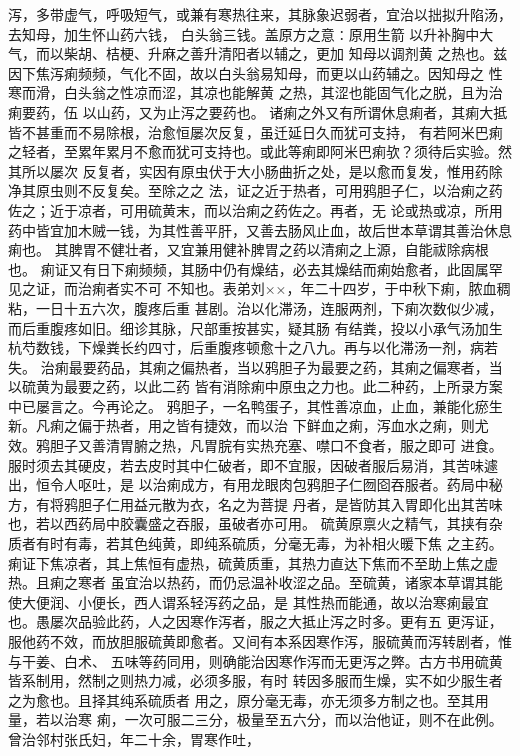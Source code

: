 \documentclass[a4paper,12pt,UTF8,twoside]{ctexbook}
\begin{document}
泻，多带虚气，呼吸短气，或兼有寒热往来，其脉象迟弱者，宜治以拙拟升陷汤，去知母，加生怀山药六钱， 
白头翁三钱。盖原方之意∶原用生箭 以升补胸中大气，而以柴胡、桔梗、升麻之善升清阳者以辅之，更加 
知母以调剂黄 之热也。兹因下焦泻痢频频，气化不固，故以白头翁易知母，而更以山药辅之。因知母之 
性寒而滑，白头翁之性凉而涩，其凉也能解黄 之热，其涩也能固气化之脱，且为治痢要药，伍 
以山药，又为止泻之要药也。 
诸痢之外又有所谓休息痢者，其痢大抵皆不甚重而不易除根，治愈恒屡次反复，虽迁延日久而犹可支持， 
有若阿米巴痢之轻者，至累年累月不愈而犹可支持也。或此等痢即阿米巴痢欤？须待后实验。然其所以屡次 
反复者，实因有原虫伏于大小肠曲折之处，是以愈而复发，惟用药除净其原虫则不反复矣。至除之之 
法，证之近于热者，可用鸦胆子仁，以治痢之药佐之；近于凉者，可用硫黄末，而以治痢之药佐之。再者，无 
论或热或凉，所用药中皆宜加木贼一钱，为其性善平肝，又善去肠风止血，故后世本草谓其善治休息痢也。 
其脾胃不健壮者，又宜兼用健补脾胃之药以清痢之上源，自能祓除病根也。 
痢证又有日下痢频频，其肠中仍有燥结，必去其燥结而痢始愈者，此固属罕见之证，而治痢者实不可 
不知也。表弟刘××，年二十四岁，于中秋下痢，脓血稠粘，一日十五六次，腹疼后重 
甚剧。治以化滞汤，连服两剂，下痢次数似少减，而后重腹疼如旧。细诊其脉，尺部重按甚实，疑其肠 
有结粪，投以小承气汤加生杭芍数钱，下燥粪长约四寸，后重腹疼顿愈十之八九。再与以化滞汤一剂，病若失。 
治痢最要药品，其痢之偏热者，当以鸦胆子为最要之药，其痢之偏寒者，当以硫黄为最要之药，以此二药 
皆有消除痢中原虫之力也。此二种药，上所录方案中已屡言之。今再论之。 
鸦胆子，一名鸭蛋子，其性善凉血，止血，兼能化瘀生新。凡痢之偏于热者，用之皆有捷效，而以治 
下鲜血之痢，泻血水之痢，则尤效。鸦胆子又善清胃腑之热，凡胃脘有实热充塞、噤口不食者，服之即可 
进食。服时须去其硬皮，若去皮时其中仁破者，即不宜服，因破者服后易消，其苦味遽出，恒令人呕吐，是 
以治痢成方，有用龙眼肉包鸦胆子仁囫囵吞服者。药局中秘方，有将鸦胆子仁用益元散为衣，名之为菩提 
丹者，是皆防其入胃即化出其苦味也，若以西药局中胶囊盛之吞服，虽破者亦可用。 
硫黄原禀火之精气，其挟有杂质者有时有毒，若其色纯黄，即纯系硫质，分毫无毒，为补相火暖下焦 
之主药。痢证下焦凉者，其上焦恒有虚热，硫黄质重，其热力直达下焦而不至助上焦之虚热。且痢之寒者 
虽宜治以热药，而仍忌温补收涩之品。至硫黄，诸家本草谓其能使大便润、小便长，西人谓系轻泻药之品，是 
其性热而能通，故以治寒痢最宜也。愚屡次品验此药，人之因寒作泻者，服之大抵止泻之时多。更有五 
更泻证，服他药不效，而放胆服硫黄即愈者。又间有本系因寒作泻，服硫黄而泻转剧者，惟与干姜、白术、 
五味等药同用，则确能治因寒作泻而无更泻之弊。古方书用硫黄皆系制用，然制之则热力减，必须多服，有时 
转因多服而生燥，实不如少服生者之为愈也。且择其纯系硫质者 
用之，原分毫无毒，亦无须多方制之也。至其用量，若以治寒 
痢，一次可服二三分，极量至五六分，而以治他证，则不在此例。曾治邻村张氏妇，年二十余，胃寒作吐， 
\end{document}
